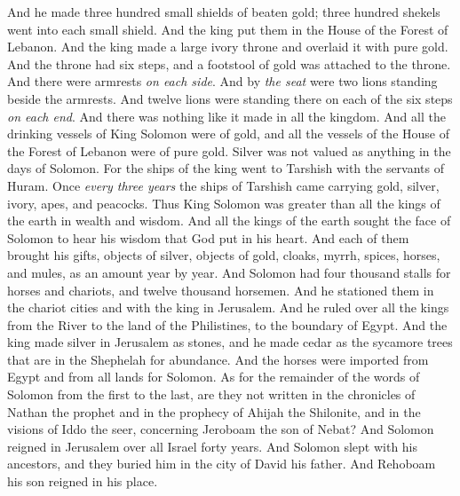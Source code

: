 \begin{biblechapter}
\verse And he made three hundred small shields of beaten gold; three hundred shekels went into each small shield. And the king put them in the House of the Forest of Lebanon.
\verse And the king made a large ivory throne and overlaid it with pure gold.
\verse And the throne had six steps, and a footstool of gold was attached to the throne. And there were armrests \textit{on each side}. And by \textit{the seat} were two lions standing beside the armrests.
\verse And twelve lions were standing there on each of the six steps \textit{on each end}. And there was nothing like it made in all the kingdom.
\verse And all the drinking vessels of King Solomon were of gold, and all the vessels of the House of the Forest of Lebanon were of pure gold. Silver was not valued as anything in the days of Solomon.
\verse For the ships of the king went to Tarshish with the servants of Huram. Once \textit{every three years} the ships of Tarshish came carrying gold, silver, ivory, apes, and peacocks.
\verse Thus King Solomon was greater than all the kings of the earth in wealth and wisdom.
\verse And all the kings of the earth sought the face of Solomon to hear his wisdom that God put in his heart.
\verse And each of them brought his gifts, objects of silver, objects of gold, cloaks, myrrh, spices, horses, and mules, as an amount year by year.
\verse And Solomon had four thousand stalls for horses and chariots, and twelve thousand horsemen. And he stationed them in the chariot cities and with the king in Jerusalem.
\verse And he ruled over all the kings from the River to the land of the Philistines, to the boundary of Egypt.
\verse And the king made silver in Jerusalem as stones, and he made cedar as the sycamore trees that are in the Shephelah for abundance.
\verse And the horses were imported from Egypt and from all lands for Solomon.
 As for the remainder of the words of Solomon from the first to the last, are they not written in the chronicles of Nathan the prophet and in the prophecy of Ahijah the Shilonite, and in the visions of Iddo the seer, concerning Jeroboam the son of Nebat?
\verse And Solomon reigned in Jerusalem over all Israel forty years.
\verse And Solomon slept with his ancestors, and they buried him in the city of David his father. And Rehoboam his son reigned in his place.
\end{biblechapter}

